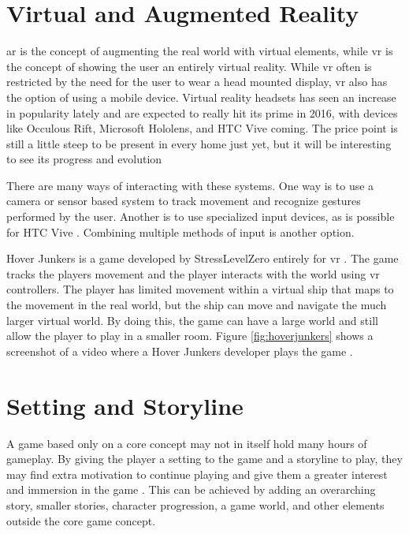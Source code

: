 \section{Virtual and Augmented Reality}
\label{immersionARVR}
\gls{ar} is the concept of augmenting the real world with virtual elements, while \gls{vr} is the concept of showing the user an entirely virtual reality.
While \gls{vr} often is restricted by the need for the user to wear a head mounted display, \gls{vr} also has the option of using a mobile device. Virtual reality headsets has seen an increase in popularity lately and are expected to really hit its prime in 2016, with devices like Occulous Rift, Microsoft Hololens, and HTC Vive coming. The price point is still a little steep to be present in every home just yet, but it will be interesting to see its progress and evolution \cite{plasencia2015one}

There are many ways of interacting with these systems.
One way is to use a camera or sensor based system to track movement and recognize gestures performed by the user.
Another is to use specialized input devices, as is possible for HTC Vive \cite{htcvive}.
Combining multiple methods of input is another option.

Hover Junkers is a game developed by StressLevelZero entirely for \gls{vr} \cite{hoverjunkers}.
The game tracks the players movement and the player interacts with the world using \gls{vr} controllers.
The player has limited movement within a virtual ship that maps to the movement in the real world, but the ship can move and navigate the much larger virtual world.
By doing this, the game can have a large world and still allow the player to play in a smaller room.
Figure \ref{fig:hoverjunkers} shows a screenshot of a video where a Hover Junkers developer plays the game \cite{hoverVideo}.

\section{Setting and Storyline}
\label{immersionStoryline}
A game based only on a core concept may not in itself hold many hours of gameplay.
By giving the player a setting to the game and a storyline to play, they may find extra motivation to continue playing and give them a greater interest and immersion in the game \cite{overmars2012}.
This can be achieved by adding an overarching story, smaller stories, character progression, a game world, and other elements outside the core game concept.

